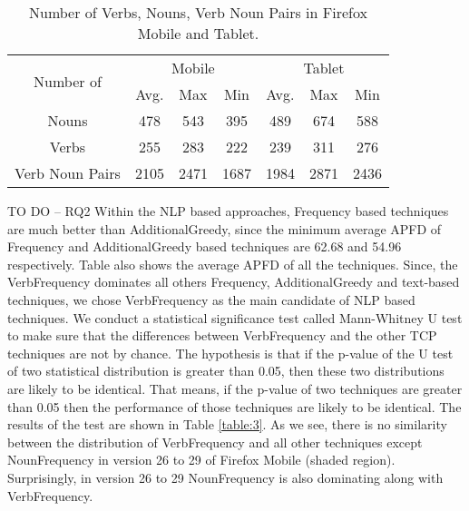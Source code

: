 \documentclass[conference]{IEEEtran}
\begin{document}

\begin{table*}[t!]
\centering
\caption{Number of Verbs, Nouns, Verb Noun Pairs in Firefox Mobile and Tablet. }
\label{table:9}
\begin{tabular}{ |c|c c c|c c c|}
\hline
\multirow{2}{*}{Number of } &
\multicolumn{3}{|c|}{Mobile} & \multicolumn{3}{|c|}{Tablet} \\
\cline{2-7}
\multicolumn{1}{|c|}{} & 
               Avg.   & Max  & Min  & Avg.   & Max  & Min  \\
\hline
Nouns           & 478    & 543  & 395  & 489    & 674  & 588  \\
Verbs           & 255    & 283  & 222  & 239    & 311  & 276  \\
Verb Noun Pairs & 2105   & 2471 & 1687 & 1984   & 2871 & 2436 \\
\hline
\end{tabular}
\end{table*}

TO DO -- RQ2
Within the NLP based approaches, Frequency based techniques are much better than AdditionalGreedy, since the minimum average APFD of Frequency and AdditionalGreedy based techniques are 62.68 and 54.96 respectively. Table also shows the average APFD of all the techniques. Since, the VerbFrequency dominates all others Frequency, AdditionalGreedy and text-based techniques, we chose VerbFrequency as the main candidate of NLP based techniques. 
We conduct a statistical significance test called Mann-Whitney U test \cite{mann1947test} to make sure that the differences between VerbFrequency and the other TCP techniques are not by chance. The hypothesis is that if the p-value of the U test of two statistical distribution is greater than 0.05, then these two distributions are likely to be identical. That means, if the p-value of two techniques are greater than 0.05 then the performance of those techniques are likely to be identical. The results of the test are shown in Table \ref{table:3}. As we see, there is no similarity between the distribution of VerbFrequency and all other techniques except NounFrequency in version 26 to 29 of Firefox Mobile (shaded region). Surprisingly, in version 26 to 29 NounFrequency is also dominating along with VerbFrequency. 
\end{document}
